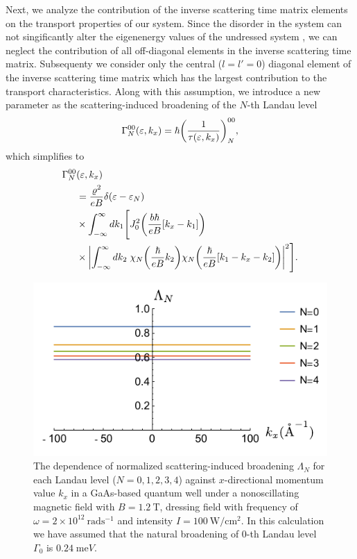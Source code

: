 Next, we analyze the contribution of the inverse scattering time matrix elements on the transport properties of our system.
Since the disorder in the system can not singificantly alter the eigenenergy values of the undressed system \cite{wackerl20}, we can neglect the contribution of all off-diagonal elements in the inverse scattering time matrix. Subsequenty we consider only the central (${l=l'=0}$) diagonal element of the inverse scattering time matrix which has the largest contribution to the transport characteristics. Along with this assumption, we introduce a new parameter as the scattering-induced broadening of the $N$-th Landau level \cite{dini16,endo09}
\begin{equation} \label{eq_14}
 \Gamma^{00}_{N}(\varepsilon,k_x) = \hbar \qty(\frac{1}{\tau(\varepsilon,k_x)})^{00}_{N},
\end{equation}
which simplifies to
\begin{equation} \label{eq_15}
 \begin{aligned}
   \Gamma^{00}_{N}& (\varepsilon,k_x) \\
   & =
   \frac { \varrho^2}{eB}
   \delta(\varepsilon - \varepsilon_{N}) \\
   & \times
   \int_{-\infty}^{\infty} d k_1 \Bigg[
   J_0^2\qty(\frac{b\hbar}{eB}[{k}_x - k_1])
   \\
   & \times
   \qty|
   \int_{-\infty}^{\infty} dk_2 \;
   {\chi}_{N}\qty(\frac{\hbar}{eB}k_2)
   {\chi}_{N}\qty(\frac{\hbar}{eB} \qty[k_1 - {k}_x - k_2])|^2\Bigg].
 \end{aligned}
\end{equation}

\begin{figure}[t]
\includegraphics[scale=0.68]{figures/fig_3}
\caption{\label{fig_3} The dependence of normalized scattering-induced broadening $\Lambda_N$ for each Landau level ($N =0,1,2,3,4$) against $x$-directional momentum value $k_x$ in a GaAs-based quantum well under a nonoscillating magnetic field with $B = 1.2~\text{T}$, dressing field with frequency of $\omega =2\times10^{12}~\text{rad}\text{s}^{-1}$ and intensity $I =100~\text{W}/\text{cm}^{2}$.
In this calculation we have assumed that the natural  broadening of $0$-th Landau level $\Gamma_0$ is $0.24\;\text{me}V$.}
\end{figure}

